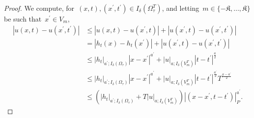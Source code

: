 \documentclass[12pt,a4paper]{amsart}
\numberwithin{equation}{section}
\theoremstyle{definition}
\theoremstyle{remark}
\newcommand{\abs}[1]{\left\lvert#1\right\rvert}
\renewcommand{\leq}{\leqslant}
\begin{document}
\begin{proof}
    We compute, for~$(x,t),(x^\prime, t^\prime) \in I_\delta(\Omega_\tau^T)$, and letting~$m \in \{-\mathfrak{K},\dots,\mathfrak{K}\}$ be such that~$x^\prime \in V_m$,
    \begin{equation}\label{EQ::uLipschitzHolderBoundWithhT}
        \begin{split}
            \abs{u(x,t)-u(x^\prime, t^\prime)} &\leq \abs{u(x,t)-u(x^\prime, t)} + \abs{u(x^\prime,t)-u(x^\prime, t^\prime)}\\
                &= \abs{h_t(x)-h_t(x^\prime)} + \abs{u(x^\prime,t)-u(x^\prime, t^\prime)}\\
                &\leq \abs{h_t}_{a^\prime; I_\delta(\Omega_\tau)} \abs{x-x^\prime}^{a^\prime} + \abs{u}_{a;I_\delta(V_m^T)} \abs{t-t^\prime}^{\frac{a}{2}}\\
                &\leq \abs{h_t}_{a^\prime; I_\delta(\Omega_\tau)} \abs{x-x^\prime}^{a^\prime} + \abs{u}_{a;I_\delta(V_m^T)} \abs{t-t^\prime}^{\frac{a^\prime}{2}} T^{\frac{a-a^\prime}{2}}\\
                &\leq \left(\abs{h_t}_{a^\prime; I_\delta(\Omega_\tau)} + T\abs{u}_{a;I_\delta(V_m^T)}\right) \abs{(x-x^\prime,t-t^\prime)}_P^{a^\prime}.
        \end{split}
    \end{equation}
    

\end{proof}
\end{document}
